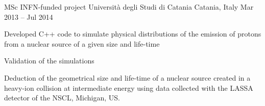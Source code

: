   \begin{cventries}    
    \cventry
    {MSc INFN-funded project}
    {Università degli Studi di Catania}
    {Catania, Italy}
    {Mar 2013 -- Jul 2014}
    {
    \begin{cvitems}
      \item Developed C++ code to simulate physical distributions of the emission of protons from a nuclear source of a given size and life-time
      \item Validation of the simulations
      \item Deduction of the geometrical size and life-time of a nuclear source created in a heavy-ion collision at intermediate energy using data collected with the LASSA detector of the NSCL, Michigan, US.
    \end{cvitems}
    }
  \end{cventries}
